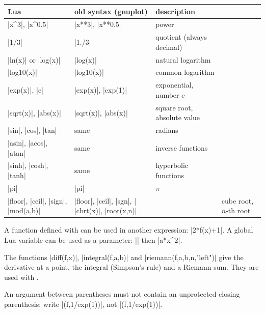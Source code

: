 \begin{center}
\begin{tabular}{lll}
\toprule
Lua & old syntax (gnuplot) & description \\
\midrule
|x^3|, |x^0.5| & |x**3|, |x**0.5| & power \\
|1/3| & |1./3| & quotient (always decimal) \\
|ln(x)| or |log(x)| & |log(x)| & natural logarithm \\
|log10(x)| & |log10(x)| & common logarithm \\
|exp(x)|, |e| & |exp(x)|, |exp(1)| & exponential, number $\text{e}$ \\
|sqrt(x)|, |abs(x)| & |sqrt(x)|, |abs(x)| & square root, absolute value \\
|sin|, |cos|, |tan| & same & radians \\
|asin|, |acos|, |atan| & same & inverse functions \\
|sinh|, |cosh|, |tanh| & same & hyperbolic functions \\
|pi| & |pi| & $\pi$ \\
|floor|, |ceil|, |sign|, |mod(a,b)| & |floor|, |ceil|, |sgn|, |%
|cbrt(x)|, |root(x,n)| & & cube root, $n$-th root \\
\bottomrule
\end{tabular}
\end{center}

\tkzHand A function defined with  can be used in another expression: |2*f(x)+1|. A global Lua variable can be used as a parameter: || then |a*x^2|.

\tkzHand The functions |diff(f,x)|, |integral(f,a,b)| and |riemann(f,a,b,n,"left")| give the derivative at a point, the integral (Simpson's rule) and a Riemann sum. They are used with .

\tkzBomb An argument between parentheses must not contain an unprotected closing parenthesis: write |(f,{1/exp(1)})|, not |(f,1/exp(1))|.

\endinput
